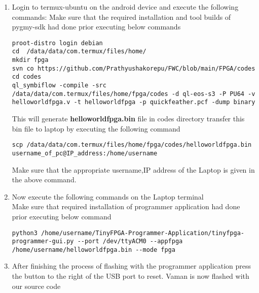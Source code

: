 \documentclass[10pt, a4paper]{article}
\begin{document}
\begin{enumerate}
\item Login to termux-ubuntu on the android device and execute the following commands:
\vspace{10mm}
Make sure that the required installation and tool builds of pygmy-sdk had done prior executing below commands\\

\begin{lstlisting}
proot-distro login debian
cd  /data/data/com.termux/files/home/
mkdir fpga
svn co https://github.com/Prathyushakorepu/FWC/blob/main/FPGA/codes
cd codes
ql_symbiflow -compile -src /data/data/com.termux/files/home/fpga/codes -d ql-eos-s3 -P PU64 -v helloworldfpga.v -t helloworldfpga -p quickfeather.pcf -dump binary
\end{lstlisting}
This will generate \textbf{helloworldfpga.bin} file in codes directory transfer this bin file to laptop by executing the following command\\
\vspace{2mm}
\begin{lstlisting}
scp /data/data/com.termux/files/home/fpga/codes/helloworldfpga.bin username_of_pc@IP_address:/home/username
\end{lstlisting}
Make sure that the appropriate username,IP address of the Laptop is given in the above command.\\
\vspace{5mm}
\item Now execute the following commands on the Laptop terminal\\
Make sure that required installation of programmer application had done prior executing below command\\
\vspace{5mm}
\begin{lstlisting}
python3 /home/username/TinyFPGA-Programmer-Application/tinyfpga-programmer-gui.py --port /dev/ttyACM0 --appfpga /home/username/helloworldfpga.bin --mode fpga
\end{lstlisting}
\vspace{5mm}
\item After finishing the process of flashing with the programmer application press the button to the right of the USB port to reset. Vaman is now flashed with our source code
\end{enumerate}
\end{document}

